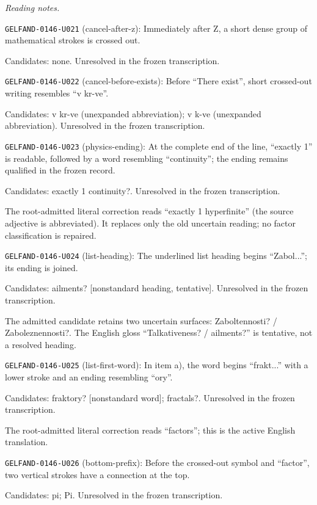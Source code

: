 \par\smallskip\noindent\textit{Reading notes.}\par
\noindent\texttt{GELFAND-0146-U021} (cancel-after-z): Immediately after Z, a short dense group of mathematical strokes is crossed out.\par
Candidates: none. Unresolved in the frozen transcription.\par
\noindent\texttt{GELFAND-0146-U022} (cancel-before-exists): Before “There exist”, short crossed-out writing resembles “v kr-ve”.\par
Candidates: v kr-ve (unexpanded abbreviation); v k-ve (unexpanded abbreviation). Unresolved in the frozen transcription.\par
\noindent\texttt{GELFAND-0146-U023} (physics-ending): At the complete end of the line, “exactly 1” is readable, followed by a word resembling “continuity”; the ending remains qualified in the frozen record.\par
Candidates: exactly 1 continuity?. Unresolved in the frozen transcription.\par
The root-admitted literal correction reads “exactly 1 hyperfinite” (the source adjective is abbreviated). It replaces only the old uncertain reading; no factor classification is repaired.\par
\noindent\texttt{GELFAND-0146-U024} (list-heading): The underlined list heading begins “Zabol...”; its ending is joined.\par
Candidates: ailments? [nonstandard heading, tentative]. Unresolved in the frozen transcription.\par
The admitted candidate retains two uncertain surfaces: Zaboltennosti? / Zaboleznennosti?. The English gloss “Talkativeness? / ailments?” is tentative, not a resolved heading.\par
\noindent\texttt{GELFAND-0146-U025} (list-first-word): In item a), the word begins “frakt...” with a lower stroke and an ending resembling “ory”.\par
Candidates: fraktory? [nonstandard word]; fractals?. Unresolved in the frozen transcription.\par
The root-admitted literal correction reads “factors”; this is the active English translation.\par
\noindent\texttt{GELFAND-0146-U026} (bottom-prefix): Before the crossed-out symbol and “factor”, two vertical strokes have a connection at the top.\par
Candidates: pi; Pi. Unresolved in the frozen transcription.\par
